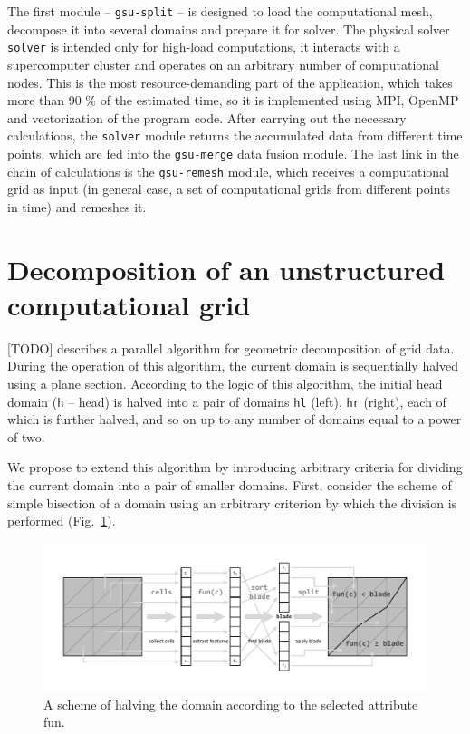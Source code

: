 \documentclass[
11pt,%
tightenlines,%
twoside,%
onecolumn,%
nofloats,%
nobibnotes,%
nofootinbib,%
superscriptaddress,%
noshowpacs,%
centertags]%
{revtex4}
\begin{document}
The first module -- \texttt{gsu-split} -- is designed to load the computational mesh, decompose it into several domains and prepare it for solver.
The physical solver \texttt{solver} is intended only for high-load computations, it interacts with a supercomputer cluster and operates on an arbitrary number of computational nodes.
This is the most resource-demanding part of the application, which takes more than 90 \% of the estimated time, so it is implemented using MPI, OpenMP and vectorization of the program code.
After carrying out the necessary calculations, the \texttt{solver} module returns the accumulated data from different time points, which are fed into the \texttt{gsu-merge} data fusion module.
The last link in the chain of calculations is the \texttt{gsu-remesh} module, which receives a computational grid as input (in general case, a set of computational grids from different points in time) and remeshes it.

\section{Decomposition of an unstructured computational grid}

[TODO] describes a parallel algorithm for geometric decomposition of grid data.
During the operation of this algorithm, the current domain is sequentially halved using a plane section.
According to the logic of this algorithm, the initial head domain (\texttt{h} -- head) is halved into a pair of domains \texttt{hl} (left), \texttt{hr} (right), each of which is further halved, and so on up to any number of domains equal to a power of two.

We propose to extend this algorithm by introducing arbitrary criteria for dividing the current domain into a pair of smaller domains.
First, consider the scheme of simple bisection of a domain using an arbitrary criterion by which the division is performed (Fig.~\ref{fig:03-split}).

\begin{figure}[h]
\includegraphics[width=1.0\textwidth]{pics/03-split.pdf}
\caption{A scheme of halving the domain according to the selected attribute fun.}\label{fig:03-split}
\end{figure}
\end{document}

